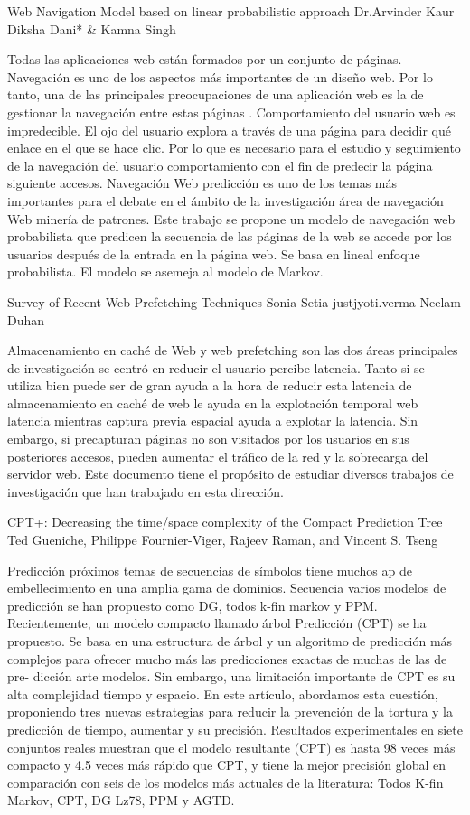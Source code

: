 Web Navigation Model based on linear probabilistic approach
Dr.Arvinder Kaur Diksha Dani* & Kamna Singh

Todas las aplicaciones web están formados por un conjunto de páginas. Navegación es uno de los aspectos más importantes de un diseño web. Por lo tanto, una de las principales preocupaciones de una aplicación web es la de gestionar la navegación entre estas páginas . Comportamiento del usuario web es impredecible. El ojo del usuario explora a través de una página para decidir qué enlace en el que se hace clic. Por lo que es necesario para el estudio y seguimiento de la navegación del usuario comportamiento con el fin de predecir la página siguiente accesos. Navegación Web predicción es uno de los temas más importantes para el debate en el ámbito de la investigación área de navegación Web minería de patrones. Este trabajo se propone un modelo de navegación web probabilista que predicen la secuencia de las páginas de la web se accede por los usuarios después de la entrada en la página web. Se basa en lineal enfoque probabilista. El modelo se asemeja al modelo de Markov.


Survey of Recent Web Prefetching Techniques
Sonia Setia
justjyoti.verma
Neelam Duhan

Almacenamiento en caché de Web y web prefetching son las dos áreas principales de investigación se centró en reducir el usuario percibe latencia. Tanto si se utiliza bien puede ser de gran ayuda a la hora de reducir esta latencia de almacenamiento en caché de web le ayuda en la explotación temporal web latencia mientras captura previa espacial ayuda a explotar la latencia. Sin embargo, si precapturan páginas no son visitados por los usuarios en sus posteriores accesos, pueden aumentar el tráfico de la red y la sobrecarga del servidor web. Este documento tiene el propósito de estudiar diversos trabajos de investigación que han trabajado en esta dirección.



CPT+: Decreasing the time/space complexity of the Compact Prediction Tree
Ted Gueniche, Philippe Fournier-Viger,
Rajeev Raman, and Vincent S. Tseng

Predicción próximos temas de secuencias de símbolos tiene muchos ap de embellecimiento en una amplia gama de dominios. Secuencia varios modelos de predicción se han propuesto como DG, todos k-fin markov y PPM. Recientemente, un modelo compacto llamado árbol Predicción (CPT) se ha propuesto. Se basa en una estructura de árbol y un algoritmo de predicción más complejos para ofrecer mucho más las predicciones exactas de muchas de las de pre- dicción arte modelos. Sin embargo, una limitación importante de CPT es su alta complejidad tiempo y espacio. En este artículo, abordamos esta cuestión, proponiendo tres nuevas estrategias para reducir la prevención de la tortura y la predicción de tiempo, aumentar y su precisión. Resultados experimentales en siete conjuntos reales muestran que el modelo resultante (CPT) es hasta 98 veces más compacto y 4.5 veces más rápido que CPT, y tiene la mejor precisión global en comparación con seis de los modelos más actuales de la literatura: Todos K-fin Markov, CPT, DG Lz78, PPM y AGTD.


